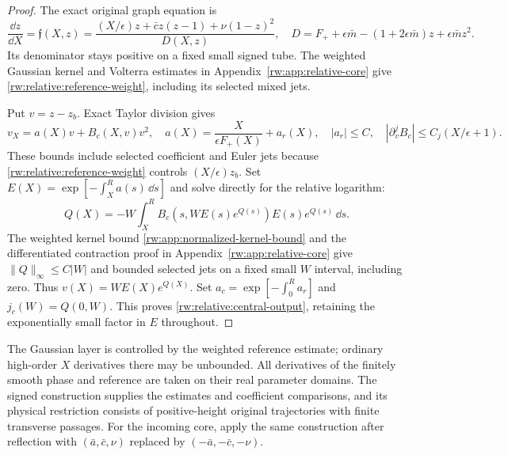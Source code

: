 \begin{proof}
The exact original graph equation is
\begin{equation}\label{rw:relative:core-field}
 \frac{\dd z}{\dd X}=\mathfrak f(X,z)
 =\frac{(X/\epsilon)z+\bar c z(z-1)+\nu(1-z)^2}{D(X,z)},
 \quad
 D=F_++\epsilon\bar m-(1+2\epsilon\bar m)z
                         +\epsilon\bar m z^2.
\end{equation}
Its denominator stays positive on a fixed small signed tube.
The weighted Gaussian kernel and Volterra estimates in
Appendix~\ref{rw:app:relative-core} give
\eqref{rw:relative:reference-weight}, including its selected mixed jets.

Put $v=z-z_b$. Exact Taylor division gives
\[
 v_X=a(X)v+B_c(X,v)v^2,\quad
 a(X)=\frac{X}{\epsilon F_+(X)}+a_r(X),\quad
 |a_r|\le C,\quad
 |\partial_v^jB_c|\le C_j(X/\epsilon+1).
\]
These bounds include selected coefficient and Euler jets because
\eqref{rw:relative:reference-weight} controls $(X/\epsilon)z_b$.
Set $E(X)=\exp[-\int_X^R a(s)\,\dd s]$ and solve directly for the
relative logarithm:
\begin{equation}\label{rw:relative:normalized-volterra}
 Q(X)=-W\int_X^R B_c(s,WE(s)e^{Q(s)})E(s)e^{Q(s)}\,\dd s.
\end{equation}
The weighted kernel bound \eqref{rw:app:normalized-kernel-bound} and
the differentiated contraction proof in Appendix~\ref{rw:app:relative-core}
give $\|Q\|_\infty\le C|W|$ and bounded selected jets on a fixed
small $W$ interval, including zero. Thus $v(X)=WE(X)e^{Q(X)}$.
Set
$a_c=\exp[-\int_0^R a_r]$ and $j_c(W)=Q(0,W)$.
This proves \eqref{rw:relative:central-output}, retaining the exponentially
small factor in $E$ throughout.
\end{proof}

The Gaussian layer is controlled by the weighted reference estimate;
ordinary high-order $X$ derivatives there may be unbounded.  All
derivatives of the finitely smooth phase and reference are taken on
their real parameter domains.  The signed construction supplies the
estimates and coefficient comparisons, and its physical restriction
consists of positive-height original trajectories with finite
transverse passages.
For the incoming core, apply the same construction after reflection
with $(\bar a,\bar c,\nu)$ replaced by
$(-\bar a,-\bar c,-\nu)$.
